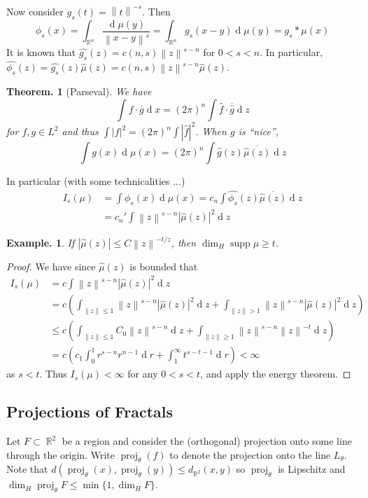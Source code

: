 \documentclass[11pt, a4paper]{memoir}
\DeclareMathOperator{\R}{{\mathbb{R}}}
\newcommand{\norm}[1]{\ensuremath{\left\lVert#1\right\rVert}}
\theoremstyle{change}
\newtheorem{theorem}{Theorem.}[section]
\theoremstyle{plain}
\theoremstyle{nonumberplain}
\newtheorem{example}{Example.}
\newtheorem{proof}{Proof}
\DeclareMathOperator{\supp}{supp}
\renewcommand{\d}[1]{\ensuremath{\operatorname{d}\!{#1}}}
\DeclareMathOperator{\proj}{proj}
\numberwithin{equation}{section}
\begin{document}
Now consider $g_s(t)=\norm{t}^{-s}$.
Then
\begin{equation*}
    \phi_s(x) = \int_{\R^n}\frac{\d{\mu(y)}}{\norm{x-y}^s}=\int_{\R^n}g_s(x-y)\d{\mu(y)}=g_s*\mu(x)
\end{equation*}
It is known that $\hat{g_s}(z)=c(n,s)\norm{z}^{s-n}$ for $0<s<n$.
In particular, $\hat{\phi_s}(z)=\hat{g_s}(z)\hat{\mu}(z)=c(n,s)\norm{z}^{s-n}\hat{\mu}(z)$.
\begin{theorem}[Parseval]
    We have
    \begin{equation*}
        \int f\cdot\overline{g}\d{x}=(2\pi)^n\int\hat{f}\cdot\overline{\hat{g}}\d{z}
    \end{equation*}
    for $f,g\in L^2$ and thus $\int|f|^2=(2\pi)^n\int|\hat{f}|^2$.
    When $g$ is ``nice'',
    \begin{equation*}
        \int g(x)\d{\mu(x)} = (2\pi)^n\int\hat{g}(z)\overline{\hat{\mu}(z)}\d{z}
    \end{equation*}
\end{theorem}
In particular (with some technicalities ...)
\begin{align*}
    I_s(\mu) &= \int\phi_s(x)\d{\mu(x)} = c_n\int\hat{\phi_s}(z)\overline{\hat{\mu}(z)}\d{z}\\
             &= c_n'\int\norm{z}^{s-n}|\hat{\mu}(z)|^2\d{z}
\end{align*}
\begin{example}
    If $|\hat{\mu}(z)|\leq C\norm{z}^{-t/z}$, then $\dim_H\supp\mu\geq t$.
\end{example}
\begin{proof}
    We have since $\hat{\mu}(z)$ is bounded that
    \begin{align*}
        I_s(\mu)&=c\int\norm{z}^{s-n}|\hat{\mu}(z)|^2\d{z}\\
                &= c\left(\int_{\norm{z}\leq 1}\norm{z}^{s-n}|\hat{\mu}(z)|^2\d{z}+ \int_{\norm{z}>1}\norm{z}^{s-n}|\hat{\mu}(z)|^2\d{z}\right)\\
                &\leq c\left(\int_{\norm{z}\leq 1}C_0\norm{z}^{s-n}\d{z} + \int_{\norm{z}\ge 1}\norm{z}^{s-n}\norm{z}^{-t}\d{z}\right)\\
                &= c\left(c_1\int_0^1 r^{s-n}r^{n-1}\d{r}+\int_1^\infty t^{s-t-1}\d{r}\right)<\infty
    \end{align*}
    as $s<t$.
    Thus $I_s(\mu)<\infty$ for any $0<s<t$, and apply the energy theorem.
\end{proof}
\subsection{Projections of Fractals}
Let $F\subset\R^2$ be a region and consider the (orthogonal) projection onto some line through the origin.
Write $\proj_\theta(f)$ to denote the projection onto the line $L_\theta$.
Note that $d(\proj_\theta(x),\proj_\theta(y))\leq d_{\R^2}(x,y)$ so $\proj_\theta$ is Lipschitz and $\dim_H\proj_\theta F\leq\min\{1,\dim_H F\}$.
\end{document}
